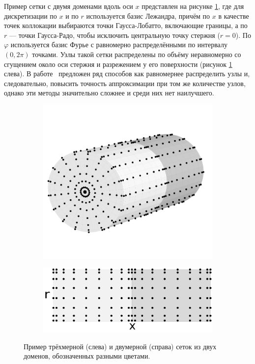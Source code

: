\documentclass[12pt, a4paper]{report}
\begin{document}
Пример сетки с двумя доменами вдоль оси $x$ представлен на рисунке \ref{fig:grid}, где для дискретизации по $x$ и по $r$ используется базис Лежандра, причём по $x$ в качестве точек коллокации выбираются точки Гаусса-Лобатто, включающие границы, а по $r$ --- точки Гаусса-Радо, чтобы исключить центральную точку стержня ($r=0$). По $\varphi$ используется базис Фурье с равномерно распределёнными по интервалу $(0, 2\pi)$ точками.
Узлы такой сетки распределены по объёму неравномерно со сгущением около оси стержня и разрежением у его поверхности (рисунок \ref{fig:grid} слева). В работе~\cite{Boyd2011} предложен ряд способов как равномернее распределить узлы и, следовательно, повысить точность аппроксимации при том же количестве узлов, однако эти методы значительно сложнее и среди них нет наилучшего.

\begin{figure}[h]
	\centering
	\begin{subfigure}{0.5\textwidth}
		\centering
		\includegraphics[width=.8\textwidth]{Figures/Grid3D}
	\end{subfigure}
	\begin{subfigure}{0.48\textwidth}
		\centering
		\includegraphics[width=\textwidth]{Figures/Grid2D}
	\end{subfigure}
	\caption{Пример трёхмерной (слева) и двумерной (справа) сеток из двух доменов, обозначенных разными цветами.}
	\label{fig:grid}
\end{figure}
\end{document}
